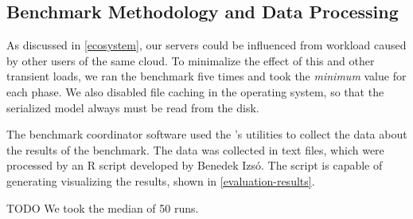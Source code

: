 \subsection{Benchmark Methodology and Data Processing}
\label{benchmark-methodology}

As discussed in \autoref{ecosystem}, our servers could be influenced from workload caused by other users of the same cloud. To minimalize the effect of this and other transient loads, we ran the benchmark five times and took the \emph{minimum} value for each phase. We also disabled file caching in the operating system, so that the serialized model always must be read from the disk.


The benchmark coordinator software used the \tb{}'s utilities to collect the data about the results of the benchmark. The data was collected in text files, which were  processed by an R script \cite{RProject} developed by Benedek Izsó. The script is capable of generating visualizing the results, shown in \autoref{evaluation-results}. 

TODO We took the median of 50 runs.

